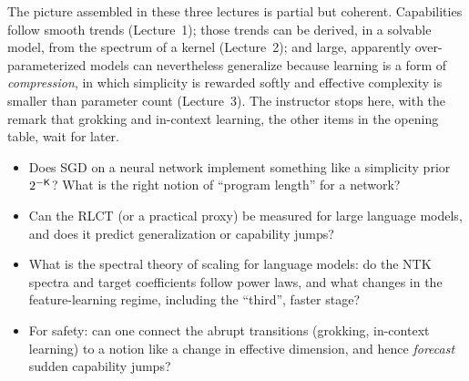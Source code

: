 The picture assembled in these three lectures is partial but coherent. Capabilities follow smooth trends (Lecture~1); those trends can be derived, in a solvable model, from the spectrum of a kernel (Lecture~2); and large, apparently over-parameterized models can nevertheless generalize
because learning is a form of \emph{compression}, in which simplicity is rewarded softly and effective complexity is smaller than parameter count (Lecture~3). The instructor stops here, with the remark that grokking and in-context learning, the other items in the opening table, wait for later.

\begin{openq}
\begin{itemize}
  \item Does SGD on a neural network implement something like a simplicity prior $2^{-\mathsf{K}}$? What is the right notion of ``program length'' for a network?
  \item Can the RLCT (or a practical proxy) be measured for large language models, and does it predict generalization or capability jumps?
  \item What is the spectral theory of scaling for language models: do the NTK spectra and target coefficients follow power laws, and what changes in the feature-learning regime, including the ``third'', faster stage?
  \item For safety: can one connect the abrupt transitions (grokking, in-context learning) to a notion like a change in effective dimension, and hence \emph{forecast} sudden capability jumps?
\end{itemize}
\end{openq}

